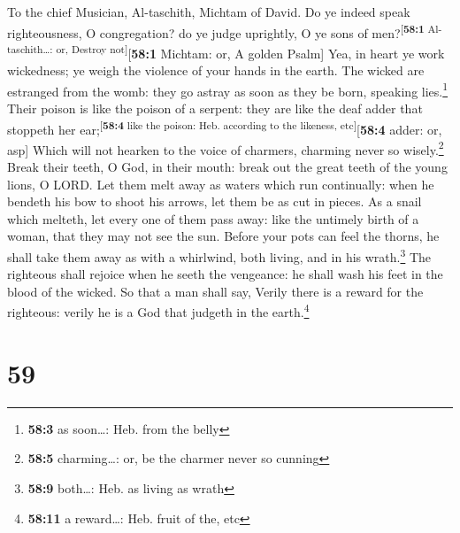 To the chief Musician, Al-taschith, Michtam of David.  Do
ye indeed speak righteousness, O congregation? do ye judge uprightly, O
ye sons of men?\textsuperscript{{[}\textbf{58:1} Al-taschith\ldots: or,
Destroy not{]}}{[}\textbf{58:1} Michtam: or, A golden Psalm{]}
 Yea, in heart ye work wickedness; ye weigh the violence
of your hands in the earth.  The wicked are estranged from
the womb: they go astray as soon as they be born, speaking
lies.\footnote{\textbf{58:3} as soon\ldots: Heb. from the belly}
 Their poison is like the poison of a serpent: they are
like the deaf adder that stoppeth her
ear;\textsuperscript{{[}\textbf{58:4} like the poison: Heb. according to
the likeness, etc{]}}{[}\textbf{58:4} adder: or, asp{]} 
Which will not hearken to the voice of charmers, charming never so
wisely.\footnote{\textbf{58:5} charming\ldots: or, be the charmer never
  so cunning}  Break their teeth, O God, in their mouth:
break out the great teeth of the young lions, O LORD.  Let
them melt away as waters which run continually: when he bendeth his bow
to shoot his arrows, let them be as cut in pieces.  As a
snail which melteth, let every one of them pass away: like the untimely
birth of a woman, that they may not see the sun.  Before
your pots can feel the thorns, he shall take them away as with a
whirlwind, both living, and in his wrath.\footnote{\textbf{58:9}
  both\ldots: Heb. as living as wrath}  The righteous
shall rejoice when he seeth the vengeance: he shall wash his feet in the
blood of the wicked.  So that a man shall say, Verily
there is a reward for the righteous: verily he is a God that judgeth in
the earth.\footnote{\textbf{58:11} a reward\ldots: Heb. fruit of the,
  etc}

\hypertarget{section-58}{%
\section{59}\label{section-58}}

